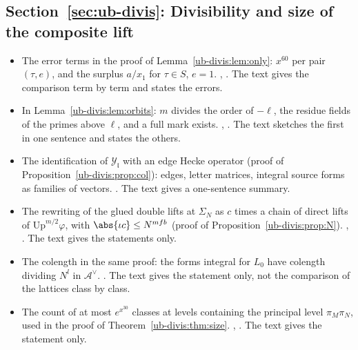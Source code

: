 \subsection*{Section~\ref{sec:ub-divis}: Divisibility and size of the composite lift}
\begin{itemize}[leftmargin=2em,itemsep=1pt]
\item The error terms in the proof of Lemma~\ref{ub-divis:lem:only}: $x^{60}$ per pair $(\tau,e)$, and
  the surplus $a/x_1$ for $\tau\in S$, $e=1$. ,
  . The text gives the comparison term by
  term and states the errors.
\item In Lemma~\ref{ub-divis:lem:orbits}: $m$ divides the order of $-\ell$, the residue fields of the
  primes above $\ell$, and a full mark exists. ,
  . The text sketches the first in one sentence and states the others.
\item The identification of $\mathcal Y_{\mathfrak l}$ with an edge Hecke operator (proof of
  Proposition~\ref{ub-divis:prop:col}): edges, letter matrices, integral source forms as families of
  vectors. . The text gives a one-sentence summary.
\item The rewriting of the glued double lifts at $\Sigma_N$ as $c$ times a chain of direct lifts of
  $\mathrm{Up}^{m/2}\varphi$, with $\abs{\iota c}\le N^{mfb}$ (proof of Proposition~\ref{ub-divis:prop:N}).
  , .
  The text gives the statements only.
\item The colength in the same proof: the forms integral for $L_0$ have colength dividing $N^l$ in
  $\mathcal A^\vee$. . The text gives the
  statement only, not the comparison of the lattices class by class.
\item The count of at most $e^{x^{30}}$ classes at levels containing the principal level
  $\pi_M\pi_N$, used in the proof of Theorem~\ref{ub-divis:thm:size}.
  , . The text gives the
  statement only.
\end{itemize}

